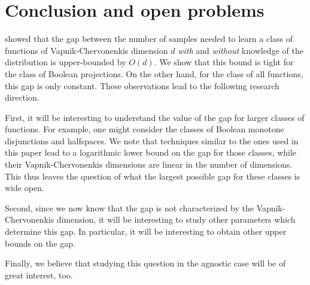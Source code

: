 \section*{Conclusion and open problems}
\citet{Darnstadt-Simon-Szorenyi-2013} showed that the gap between the number of samples needed to learn a class of functions of Vapnik-Chervonenkis dimension $d$ \emph{with} and \emph{without} knowledge of the distribution is upper-bounded by $O(d)$. We show that this bound is tight for the class of Boolean projections. On the other hand, for the class of all functions, this gap is only constant. These observations lead to the following research direction. 

First, it will be interesting to understand the value of the gap for larger classes of functions. For example, one might consider the classes of Boolean monotone disjunctions and halfspaces. We note that techniques similar to the ones used in this paper lead to a logarithmic lower bound on the gap for those classes, while their Vapnik-Chervonenkis dimensions are linear in the number of dimensions. This thus leaves the question of what the largest possible gap for these classes is wide open. 

Second, since we now know that the gap is not characterized by the Vapnik-Chervonenkis dimension, it will be interesting to study other parameters which determine this gap. In particular, it will be interesting to obtain other upper bounds on the gap.

Finally, we believe that studying this question in the agnostic case will be of great interest, too.
